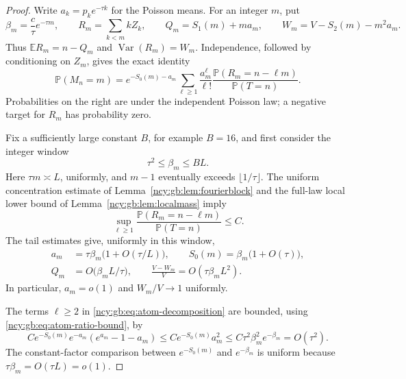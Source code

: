 \documentclass[11pt,letterpaper]{article}
\numberwithin{equation}{section}
\theoremstyle{remark}\newtheorem{remark}[theorem]{Remark}
\theoremstyle{definition}\newtheorem{definition}[theorem]{Definition}\theoremstyle{plain}
\newcommand{\E}{\mathbb E}
\newcommand{\Pbb}{\mathbb P}
\begin{document}
\begin{proof}
Write $a_k=p_ke^{-\tau k}$ for the Poisson means.  For an integer $m$,
put
\[
 \beta_m=\frac c\tau e^{-\tau m},\qquad
 R_m=\sum_{k<m}kZ_k,\qquad
 Q_m=S_1(m)+ma_m,\qquad
 W_m=V-S_2(m)-m^2a_m.
\]
Thus $\E R_m=n-Q_m$ and $\operatorname{Var}(R_m)=W_m$.
Independence, followed by conditioning on $Z_m$, gives the exact identity
\begin{equation}
\label{ncy:gb:eq:atom-decomposition}
 \Pbb(M_n=m)
 =e^{-S_0(m)-a_m}
   \sum_{\ell\ge1}\frac{a_m^\ell}{\ell!}
     \frac{\Pbb(R_m=n-\ell m)}{\Pbb(T=n)}.
\end{equation}
Probabilities on the right are under the independent Poisson law;
a negative target for $R_m$ has probability zero.

Fix a sufficiently large constant $B$, for example $B=16$, and first
consider the integer window
\begin{equation}
\label{ncy:gb:eq:atom-window}
 \tau^2\le\beta_m\le BL.
\end{equation}
Here $\tau m\asymp L$, uniformly, and $m-1$ eventually exceeds
$\lfloor1/\tau\rfloor$.  The uniform concentration estimate of
Lemma~\ref{ncy:gb:lem:fourierblock} and the full-law local lower bound of
Lemma~\ref{ncy:gb:lem:localmass} imply
\begin{equation}
\label{ncy:gb:eq:atom-ratio-bound}
 \sup_{\ell\ge1}
 \frac{\Pbb(R_m=n-\ell m)}{\Pbb(T=n)}\le C.
\end{equation}
The tail estimates give, uniformly in this window,
\begin{equation}
\label{ncy:gb:eq:atom-tail-estimates}
 \begin{split}
 a_m&=\tau\beta_m\bigl(1+O(\tau/L)\bigr),\qquad
 S_0(m)=\beta_m\bigl(1+O(\tau)\bigr),\\
 Q_m&=O\bigl(\beta_mL/\tau\bigr),\qquad
 \frac{V-W_m}{V}=O(\tau\beta_mL^2).
 \end{split}
\end{equation}
In particular, $a_m=o(1)$ and $W_m/V\to1$ uniformly.

The terms $\ell\ge2$ in \eqref{ncy:gb:eq:atom-decomposition} are bounded,
using \eqref{ncy:gb:eq:atom-ratio-bound}, by
\[
 C e^{-S_0(m)}e^{-a_m}(e^{a_m}-1-a_m)
 \le C e^{-S_0(m)}a_m^2
 \le C\tau^2\beta_m^2e^{-\beta_m}
 =O(\tau^2).
\]
The constant-factor comparison between $e^{-S_0(m)}$ and
$e^{-\beta_m}$ is uniform because $\tau\beta_m=O(\tau L)=o(1)$.


\end{proof}
\end{document}
